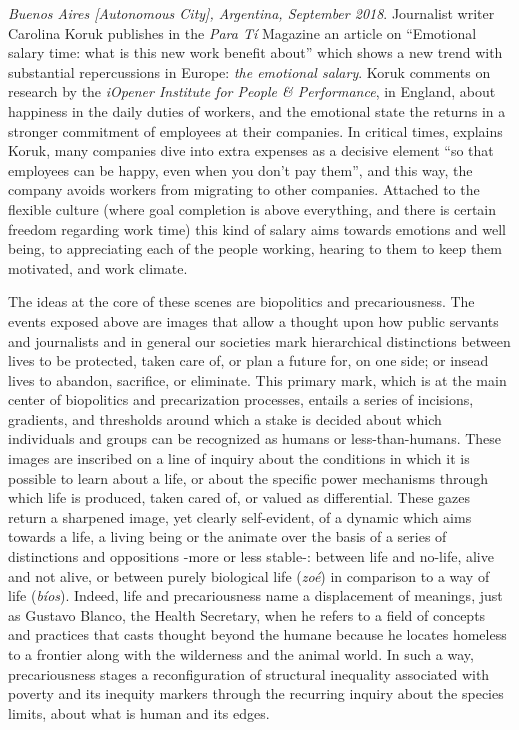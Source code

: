 \documentclass[a4paper,]{scrartcl}
\begin{document}
\emph{Buenos Aires {[}Autonomous City{]}, Argentina, September 2018}.
Journalist writer Carolina Koruk publishes in the \emph{Para Tí}
Magazine an article on ``Emotional salary time: what is this new work
benefit about'' which shows a new trend with substantial repercussions
in Europe: \emph{the emotional salary}. Koruk comments on research by
the \emph{iOpener Institute for People \& Performance}, in England,
about happiness in the daily duties of workers, and the emotional state
the returns in a stronger commitment of employees at their companies. In
critical times, explains Koruk, many companies dive into extra expenses
as a decisive element ``so that employees can be happy, even when you
don't pay them'', and this way, the company avoids workers from
migrating to other companies. Attached to the flexible culture (where
goal completion is above everything, and there is certain freedom
regarding work time) this kind of salary aims towards emotions and well
being, to appreciating each of the people working, hearing to them to
keep them motivated, and work climate.

The ideas at the core of these scenes are biopolitics and
precariousness. The events exposed above are images that allow a thought
upon how public servants and journalists and in general our societies
mark hierarchical distinctions between lives to be protected, taken care
of, or plan a future for, on one side; or insead lives to abandon,
sacrifice, or eliminate. This primary mark, which is at the main center
of biopolitics and precarization processes, entails a series of
incisions, gradients, and thresholds around which a stake is decided
about which individuals and groups can be recognized as humans or
less-than-humans. These images are inscribed on a line of inquiry about
the conditions in which it is possible to learn about a life, or about
the specific power mechanisms through which life is produced, taken
cared of, or valued as differential. These gazes return a sharpened
image, yet clearly self-evident, of a dynamic which aims towards a life,
a living being or the animate over the basis of a series of distinctions
and oppositions -more or less stable-: between life and no-life, alive
and not alive, or between purely biological life (\emph{zoé}) in
comparison to a way of life (\emph{bíos}). Indeed, life and
precariousness name a displacement of meanings, just as Gustavo Blanco,
the Health Secretary, when he refers to a field of concepts and
practices that casts thought beyond the humane because he locates
homeless to a frontier along with the wilderness and the animal world.
In such a way, precariousness stages a reconfiguration of structural
inequality associated with poverty and its inequity markers through the
recurring inquiry about the species limits, about what is human and its
edges.
\end{document}
